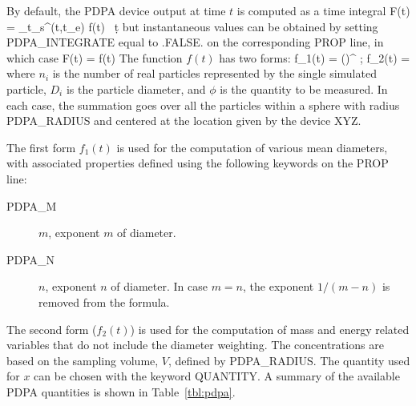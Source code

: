 \documentclass[11pt]{book}
\begin{document}
By default, the PDPA device output at time $t$ is computed as a time integral
\be
F(t) =  \int_{t_{\rm s}}^{\min(t,t_{\rm e})} f(t) \, \d t
\ee
but instantaneous values can be obtained by setting {\ct PDPA\_INTEGRATE} equal to {\ct .FALSE.} on the corresponding {\ct PROP} line, in which case
\be
F(t) = f(t)
\ee
The function $f(t)$ has two forms:
\be
f_1(t) =  \left(\right)^{}
\quad ; \quad
f_2(t) = 
\ee
where $n_i$ is the number of real particles represented by the single simulated particle, $D_i$
is the particle diameter, and $\phi$ is the quantity to be measured. In each case, the summation goes over all the particles within a sphere
with radius {\ct PDPA\_RADIUS} and centered at the location given by the device {\ct XYZ}.

The first form $f_1(t)$ is used for the computation of various mean diameters, with
associated properties defined using the following keywords on the {\ct PROP} line:
\begin{description}
\item[{\ct PDPA\_M}] $m$, exponent $m$ of diameter.
\item[{\ct PDPA\_N}] $n$, exponent $n$ of diameter. In case $m=n$, the exponent $1/(m-n)$ is removed from the formula.
\end{description}
The second form ($f_2(t)$) is used for the computation of mass and energy related variables that do not include the diameter weighting.
The concentrations are based on the sampling volume, $V$, defined by {\ct PDPA\_RADIUS}.
The quantity used for $x$ can be chosen with the keyword {\ct QUANTITY}.
A summary of the available PDPA quantities is shown in Table~\ref{tbl:pdpa}.
\end{document}
